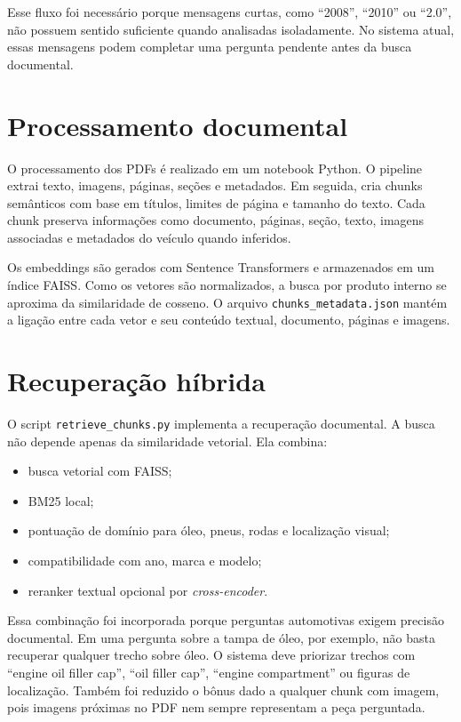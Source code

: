 Esse fluxo foi necessário porque mensagens curtas, como ``2008'', ``2010'' ou ``2.0'', não possuem sentido suficiente quando analisadas isoladamente. No sistema atual, essas mensagens podem completar uma pergunta pendente antes da busca documental.

\section{Processamento documental}

O processamento dos PDFs é realizado em um notebook Python. O pipeline extrai texto, imagens, páginas, seções e metadados. Em seguida, cria chunks semânticos com base em títulos, limites de página e tamanho do texto. Cada chunk preserva informações como documento, páginas, seção, texto, imagens associadas e metadados do veículo quando inferidos.

Os embeddings são gerados com Sentence Transformers e armazenados em um índice FAISS. Como os vetores são normalizados, a busca por produto interno se aproxima da similaridade de cosseno. O arquivo \texttt{chunks\_metadata.json} mantém a ligação entre cada vetor e seu conteúdo textual, documento, páginas e imagens.

\section{Recuperação híbrida}

O script \texttt{retrieve\_chunks.py} implementa a recuperação documental. A busca não depende apenas da similaridade vetorial. Ela combina:

\begin{itemize}
  \item busca vetorial com FAISS;
  \item BM25 local;
  \item pontuação de domínio para óleo, pneus, rodas e localização visual;
  \item compatibilidade com ano, marca e modelo;
  \item reranker textual opcional por \textit{cross-encoder}.
\end{itemize}

Essa combinação foi incorporada porque perguntas automotivas exigem precisão documental. Em uma pergunta sobre a tampa de óleo, por exemplo, não basta recuperar qualquer trecho sobre óleo. O sistema deve priorizar trechos com ``engine oil filler cap'', ``oil filler cap'', ``engine compartment'' ou figuras de localização. Também foi reduzido o bônus dado a qualquer chunk com imagem, pois imagens próximas no PDF nem sempre representam a peça perguntada.

